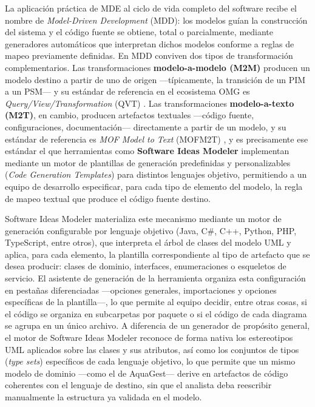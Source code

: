 \documentclass[11pt,a4paper]{article}
\begin{document}
La aplicación práctica de MDE al ciclo de vida completo del software recibe el nombre de \emph{Model-Driven Development} (MDD): los modelos guían la construcción del sistema y el código fuente se obtiene, total o parcialmente, mediante generadores automáticos que interpretan dichos modelos conforme a reglas de mapeo previamente definidas. En MDD conviven dos tipos de transformación complementarios. Las transformaciones \textbf{modelo-a-modelo (M2M)} producen un modelo destino a partir de uno de origen —típicamente, la transición de un PIM a un PSM— y su estándar de referencia en el ecosistema OMG es \emph{Query/View/Transformation} (QVT) \citep{omg_qvt2016}. Las transformaciones \textbf{modelo-a-texto (M2T)}, en cambio, producen artefactos textuales —código fuente, configuraciones, documentación— directamente a partir de un modelo, y su estándar de referencia es \emph{MOF Model to Text} (MOFM2T) \citep{omg_mofm2t2008}, y es precisamente ese estándar el que herramientas como \textbf{Software Ideas Modeler} implementan mediante un motor de plantillas de generación predefinidas y personalizables (\emph{Code Generation Templates}) para distintos lenguajes objetivo, permitiendo a un equipo de desarrollo especificar, para cada tipo de elemento del modelo, la regla de mapeo textual que produce el código fuente destino.

Software Ideas Modeler materializa este mecanismo mediante un motor de generación configurable por lenguaje objetivo (Java, C\#, C++, Python, PHP, TypeScript, entre otros), que interpreta el árbol de clases del modelo UML y aplica, para cada elemento, la plantilla correspondiente al tipo de artefacto que se desea producir: clases de dominio, interfaces, enumeraciones o esqueletos de servicio. El asistente de generación de la herramienta organiza esta configuración en pestañas diferenciadas —opciones generales, importaciones y opciones específicas de la plantilla—, lo que permite al equipo decidir, entre otras cosas, si el código se organiza en subcarpetas por paquete o si el código de cada diagrama se agrupa en un único archivo. A diferencia de un generador de propósito general, el motor de Software Ideas Modeler reconoce de forma nativa los estereotipos UML aplicados sobre las clases y sus atributos, así como los conjuntos de tipos (\emph{type sets}) específicos de cada lenguaje objetivo, lo que permite que un mismo modelo de dominio —como el de AquaGest— derive en artefactos de código coherentes con el lenguaje de destino, sin que el analista deba reescribir manualmente la estructura ya validada en el modelo.
\end{document}
